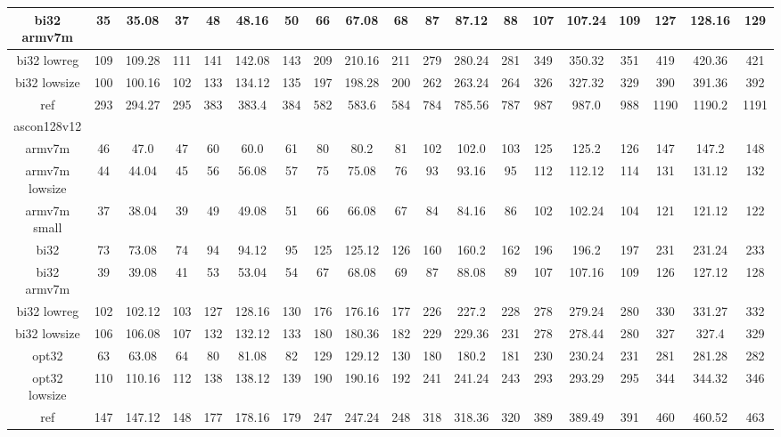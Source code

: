 \documentclass[12pt,a4paper,italian]{report}
\begin{document}
\begin{landscape}
\begin{table}[]
\begin{adjustbox}{width=600pt}
\begin{tabular}{|c|c|c|c|c|c|c|c|c|c|c|c|c|c|c|c|c|c|c|}
				\hline
				bi32 armv7m & 35 & 35.08 & 37 & 48 & 48.16 & 50 & 66 & 67.08 & 68 & 87 & 87.12 & 88 & 107 & 107.24 & 109 & 127 & 128.16 & 129 \\
				\hline
				bi32 lowreg & 109 & 109.28 & 111 & 141 & 142.08 & 143 & 209 & 210.16 & 211 & 279 & 280.24 & 281 & 349 & 350.32 & 351 & 419 & 420.36 & 421 \\
				\hline
				bi32 lowsize & 100 & 100.16 & 102 & 133 & 134.12 & 135 & 197 & 198.28 & 200 & 262 & 263.24 & 264 & 326 & 327.32 & 329 & 390 & 391.36 & 392 \\
				\hline
				ref & 293 & 294.27 & 295 & 383 & 383.4 & 384 & 582 & 583.6 & 584 & 784 & 785.56 & 787 & 987 & 987.0 & 988 & 1190 & 1190.2 & 1191 \\
				\hline
				ascon128v12 & & & & & & & & & & & & & & & & & & \\
				\hline
				armv7m & 46 & 47.0 & 47 & 60 & 60.0 & 61 & 80 & 80.2 & 81 & 102 & 102.0 & 103 & 125 & 125.2 & 126 & 147 & 147.2 & 148 \\
				\hline
				armv7m lowsize & 44 & 44.04 & 45 & 56 & 56.08 & 57 & 75 & 75.08 & 76 & 93 & 93.16 & 95 & 112 & 112.12 & 114 & 131 & 131.12 & 132 \\
				\hline
				armv7m small & 37 & 38.04 & 39 & 49 & 49.08 & 51 & 66 & 66.08 & 67 & 84 & 84.16 & 86 & 102 & 102.24 & 104 & 121 & 121.12 & 122 \\
				\hline
				bi32 & 73 & 73.08 & 74 & 94 & 94.12 & 95 & 125 & 125.12 & 126 & 160 & 160.2 & 162 & 196 & 196.2 & 197 & 231 & 231.24 & 233 \\
				\hline
				bi32 armv7m & 39 & 39.08 & 41 & 53 & 53.04 & 54 & 67 & 68.08 & 69 & 87 & 88.08 & 89 & 107 & 107.16 & 109 & 126 & 127.12 & 128 \\
				\hline
				bi32 lowreg & 102 & 102.12 & 103 & 127 & 128.16 & 130 & 176 & 176.16 & 177 & 226 & 227.2 & 228 & 278 & 279.24 & 280 & 330 & 331.27 & 332 \\
				\hline
				bi32 lowsize & 106 & 106.08 & 107 & 132 & 132.12 & 133 & 180 & 180.36 & 182 & 229 & 229.36 & 231 & 278 & 278.44 & 280 & 327 & 327.4 & 329 \\
				\hline
				opt32 & 63 & 63.08 & 64 & 80 & 81.08 & 82 & 129 & 129.12 & 130 & 180 & 180.2 & 181 & 230 & 230.24 & 231 & 281 & 281.28 & 282 \\
				\hline
				opt32 lowsize & 110 & 110.16 & 112 & 138 & 138.12 & 139 & 190 & 190.16 & 192 & 241 & 241.24 & 243 & 293 & 293.29 & 295 & 344 & 344.32 & 346 \\
				\hline
				ref & 147 & 147.12 & 148 & 177 & 178.16 & 179 & 247 & 247.24 & 248 & 318 & 318.36 & 320 & 389 & 389.49 & 391 & 460 & 460.52 & 463 \\

\end{tabular}
\end{adjustbox}
\end{table}
\end{landscape}
\end{document}
